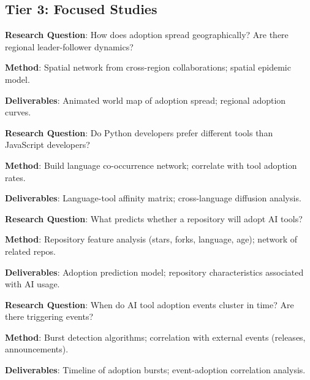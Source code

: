 \documentclass[11pt,letterpaper]{article}
\begin{document}
\subsection{Tier 3: Focused Studies}

\begin{tcolorbox}[colback=yellow!5,colframe=yellow!50!black,title=Project 3A: Geographic Diffusion of AI Tools]
\textbf{Research Question}: How does adoption spread geographically? Are there regional leader-follower dynamics?

\textbf{Method}: Spatial network from cross-region collaborations; spatial epidemic model.

\textbf{Deliverables}: Animated world map of adoption spread; regional adoption curves.
\end{tcolorbox}

\begin{tcolorbox}[colback=yellow!5,colframe=yellow!50!black,title=Project 3B: Programming Language Networks and Tool Preference]
\textbf{Research Question}: Do Python developers prefer different tools than JavaScript developers?

\textbf{Method}: Build language co-occurrence network; correlate with tool adoption rates.

\textbf{Deliverables}: Language-tool affinity matrix; cross-language diffusion analysis.
\end{tcolorbox}

\begin{tcolorbox}[colback=yellow!5,colframe=yellow!50!black,title=Project 3C: Repository Adoption Dynamics]
\textbf{Research Question}: What predicts whether a repository will adopt AI tools?

\textbf{Method}: Repository feature analysis (stars, forks, language, age); network of related repos.

\textbf{Deliverables}: Adoption prediction model; repository characteristics associated with AI usage.
\end{tcolorbox}

\begin{tcolorbox}[colback=yellow!5,colframe=yellow!50!black,title=Project 3D: Temporal Burst Analysis]
\textbf{Research Question}: When do AI tool adoption events cluster in time? Are there triggering events?

\textbf{Method}: Burst detection algorithms; correlation with external events (releases, announcements).

\textbf{Deliverables}: Timeline of adoption bursts; event-adoption correlation analysis.
\end{tcolorbox}
\end{document}
